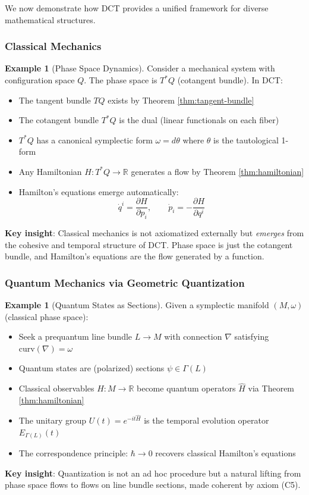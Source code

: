 \documentclass[11pt]{article}
\theoremstyle{definition}
\newtheorem{example}[theorem]{Example}
\begin{document}
We now demonstrate how DCT provides a unified framework for diverse mathematical structures.

\subsubsection{Classical Mechanics}

\begin{example}[Phase Space Dynamics]
Consider a mechanical system with configuration space $Q$. The phase space is $T^*Q$ (cotangent bundle). In DCT:

\begin{itemize}
\item The tangent bundle $TQ$ exists by Theorem \ref{thm:tangent-bundle}
\item The cotangent bundle $T^*Q$ is the dual (linear functionals on each fiber)
\item $T^*Q$ has a canonical symplectic form $\omega = d\theta$ where $\theta$ is the tautological 1-form
\item Any Hamiltonian $H : T^*Q \to \mathbb{R}$ generates a flow by Theorem \ref{thm:hamiltonian}
\item Hamilton's equations emerge automatically:
\[
\dot{q}^i = \frac{\partial H}{\partial p_i}, \qquad \dot{p}_i = -\frac{\partial H}{\partial q^i}
\]
\end{itemize}

\textbf{Key insight}: Classical mechanics is not axiomatized externally but \emph{emerges} from the cohesive and temporal structure of DCT. Phase space is just the cotangent bundle, and Hamilton's equations are the flow generated by a function.
\end{example}

\subsubsection{Quantum Mechanics via Geometric Quantization}

\begin{example}[Quantum States as Sections]
Given a symplectic manifold $(M, \omega)$ (classical phase space):

\begin{itemize}
\item Seek a prequantum line bundle $L \to M$ with connection $\nabla$ satisfying $\text{curv}(\nabla) = \omega$
\item Quantum states are (polarized) sections $\psi \in \Gamma(L)$
\item Classical observables $H : M \to \mathbb{R}$ become quantum operators $\hat{H}$ via Theorem \ref{thm:hamiltonian}
\item The unitary group $U(t) = e^{-it\hat{H}}$ is the temporal evolution operator $E_{\Gamma(L)}(t)$
\item The correspondence principle: $\hbar \to 0$ recovers classical Hamilton's equations
\end{itemize}

\textbf{Key insight}: Quantization is not an ad hoc procedure but a natural lifting from phase space flows to flows on line bundle sections, made coherent by axiom (C5).
\end{example}
\end{document}
